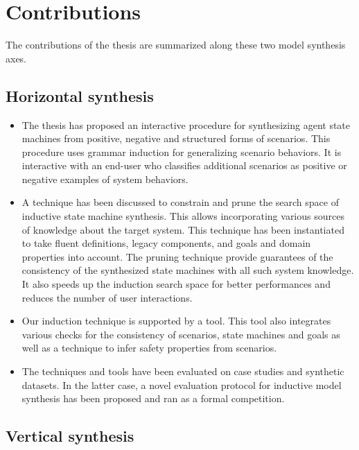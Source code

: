 \section{Contributions\label{section:conclusion-contributions}}

The contributions of the thesis are summarized along these two model synthesis axes.

\subsection*{Horizontal synthesis}

\begin{itemize}
\item The thesis has proposed an interactive procedure for synthesizing agent state machines from positive, negative and structured forms of scenarios. This procedure uses grammar induction for generalizing scenario behaviors. It is interactive with an end-user who classifies additional scenarios as positive or negative examples of system behaviors.
\item A technique has been discussed to constrain and prune the search space of inductive state machine synthesis. This allows incorporating various sources of knowledge about the target system. This technique has been instantiated to take fluent definitions, legacy components, and goals and domain properties into account. The pruning technique provide guarantees of the consistency of the synthesized state machines with all such system knowledge. It also speeds up the induction search space for better performances and reduces the number of user interactions.
\item Our induction technique is supported by a tool. This tool also integrates various checks for the consistency of scenarios, state machines and goals as well as a technique to infer safety properties from scenarios. 
\item The techniques and tools have been evaluated on case studies and synthetic datasets. In the latter case, a novel evaluation protocol for inductive model synthesis has been proposed and ran as a formal competition.
\end{itemize}

\subsection*{Vertical synthesis}


